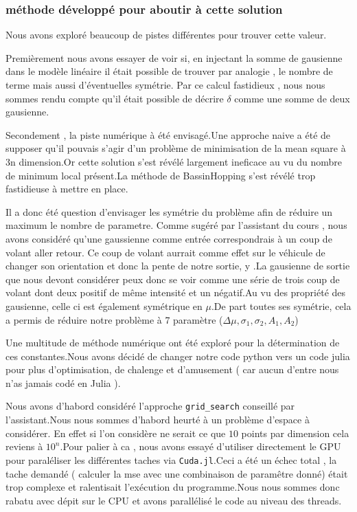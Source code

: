 \documentclass[11pt,a4paper]{article}
\begin{document}
\subsubsection{méthode développé pour aboutir à cette solution}
Nous avons exploré beaucoup de pistes différentes pour trouver cette valeur. 
\par Premièrement nous avons essayer de voir si, en injectant la somme de gausienne dans le modèle linéaire il était possible de trouver par analogie , le nombre de terme mais aussi d'éventuelles symétrie. Par ce calcul fastidieux , nous nous sommes rendu compte qu'il était possible de décrire $\delta$ comme une somme de deux gausienne. 
\par Secondement , la piste numérique à été envisagé.Une approche naive a été de supposer qu'il pouvais s'agir d'un problème de minimisation de la mean square à 3n dimension.Or cette solution s'est révélé largement ineficace au vu du nombre de minimum local présent.La méthode de BassinHopping s'est révélé trop fastidieuse à mettre en place.
\par Il a donc été question d'envisager les symétrie du problème afin de réduire un maximum le nombre de parametre. Comme sugéré par l'assistant du cours , nous avons considéré qu'une gaussienne comme entrée correspondrais à un coup de volant aller retour. Ce coup de volant aurrait comme effet sur le véhicule de changer son orientation et donc la pente de notre sortie, y .La gausienne de sortie que nous devont considérer peux donc se voir comme une série de trois coup de volant dont deux positif de même intensité et un négatif.Au vu des propriété des gausienne, celle ci est également symétrique en $\mu$.De part toutes ses symétrie, cela a permis de réduire notre problème à 7 paramètre ($\Delta \mu , \sigma_1, \sigma_2 , A_1 , A_2$)

\par Une multitude de méthode numérique ont été exploré pour la détermination de ces constantes.Nous avons décidé de changer notre code python vers un code julia pour plus d'optimisation, de chalenge et d'amusement ( car aucun d'entre nous n'as jamais codé en Julia ).
\par Nous avons d'habord considéré l'approche \texttt{grid\_search} conseillé par l'assistant.Nous nous sommes d'habord heurté à un problème d'espace à considérer. En effet si l'on considère ne serait ce que $10$ points par dimension cela reviens à $10^n$.Pour palier à ca , nous avons essayé d'utiliser directement le GPU pour paraléliser les différentes taches via \texttt{Cuda.jl}.Ceci a été un échec total , la tache demandé ( calculer la mse avec une combinaison de paramêtre donné) était trop complexe et ralentisait l'exécution du programme.Nous nous sommes donc rabatu avec dépit sur le CPU et avons parallélisé le code au niveau des threads.
 
\end{document}
